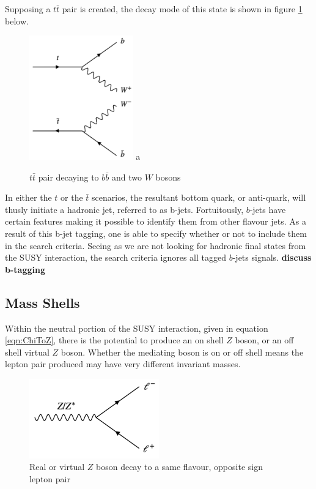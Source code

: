 Supposing a $t \bar{t}$ pair is created, the decay mode of this state is shown in figure \ref{fig:ttbar} below.

\begin{figure}[H] %
   \centering
   \includegraphics[width=0.4\textwidth]{Pictures/ttbar.png} a
   \caption{$t \bar{t}$ pair decaying to $b \bar{b}$ and two $W$ bosons}
   \label{fig:ttbar}
\end{figure}

\noindent In either the $t$ or the $\bar{t}$ scenarios, the resultant bottom quark, or anti-quark, will thusly initiate a hadronic jet, referred to as b-jets.
Fortuitously, $b$-jets have certain features making it possible to identify them from other flavour jets.  
As a result of this b-jet tagging, one is able to specify whether or not to include them in the search criteria.
Seeing as we are not looking for hadronic final states from the SUSY interaction, the search criteria ignores all tagged $b$-jets signals.
\textbf{\large discuss b-tagging}

\subsection{Mass Shells}
Within the neutral portion of the SUSY interaction, given in equation \ref{eqn:ChiToZ}, there is the potential to produce an on shell $Z$ boson, or an off shell virtual $Z$ boson.
Whether the mediating boson is on or off shell means the lepton pair produced may have very different invariant masses.

\begin{figure}[H] %
   \centering
   \includegraphics[width=0.5\textwidth]{Pictures/ZtoLL.png} 
   \caption{Real or virtual $Z$ boson decay to a same flavour, opposite sign lepton pair}
   \label{fig:example}
\end{figure}

